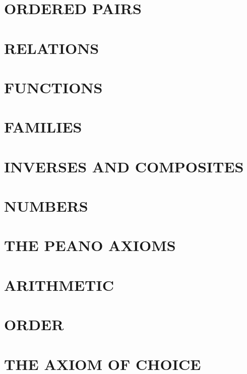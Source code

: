\documentclass[fontsize=12pt,b5paper,
pagesize=auto]{book}
\theoremstyle{axiom}
\theoremstyle{exc}
\begin{document}
\chapter{ORDERED PAIRS}


\chapter{RELATIONS}


\chapter{FUNCTIONS}


\chapter{FAMILIES}


\chapter{INVERSES AND COMPOSITES}


\chapter{NUMBERS}


\chapter{THE PEANO AXIOMS}


\chapter{ARITHMETIC}


\chapter{ORDER}


\chapter{THE AXIOM OF CHOICE}

\end{document}
